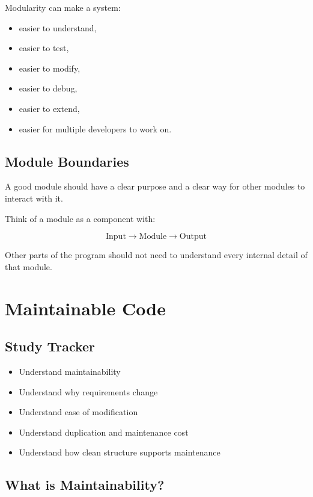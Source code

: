 \documentclass[11pt,a4paper]{article}
\newcommand{\checkitem}{$\square$}
\begin{document}
Modularity can make a system:

\begin{itemize}
    \item easier to understand,
    \item easier to test,
    \item easier to modify,
    \item easier to debug,
    \item easier to extend,
    \item easier for multiple developers to work on.
\end{itemize}

\subsection{Module Boundaries}

A good module should have a clear purpose and a clear way for other modules
to interact with it.

Think of a module as a component with:

\[
\boxed{\text{Input} \rightarrow \text{Module} \rightarrow \text{Output}}
\]

Other parts of the program should not need to understand every internal detail
of that module.

\section{Maintainable Code}

\subsection{Study Tracker}

\begin{itemize}[label=\checkitem]
    \item Understand maintainability
    \item Understand why requirements change
    \item Understand ease of modification
    \item Understand duplication and maintenance cost
    \item Understand how clean structure supports maintenance
\end{itemize}

\subsection{What is Maintainability?}
\end{document}
